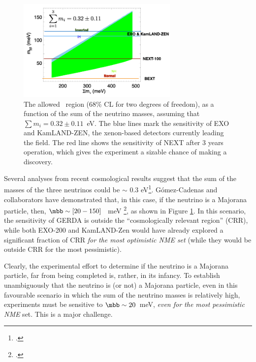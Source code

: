 \begin{figure}
\centering
\includegraphics[width=0.70\textwidth]{img/SensiCRR.png}
\caption{\small The allowed \mbb\ region (68\% CL for two degrees of freedom), as a function of the sum of the neutrino masses, assuming that 
$\sum m_i = 0.32\pm 0.11$~eV. The blue lines mark the sensitivity of EXO and KamLAND-ZEN, the xenon-based detectors currently leading the field. The red line shows the sensitivity of NEXT after 3 years operation, which gives the experiment a sizable chance of making a discovery.} 
\label{fig.mbb}
\end{figure}

 Several analyses from recent cosmological results suggest that the sum of the masses of the three neutrinos could be $\sim$ 0.3 eV\footcite{PhysRevLett.112.051303}. G\'omez-Cadenas and collaborators have demonstrated that, in this case, if the neutrino is a Majorana particle, then, $\mbb \sim [20-150]$~ meV \footcite{GomezCadenas:2013ue}, as shown in Figure \ref{fig.mbb}. In this scenario, the sensitivity of GERDA is outside the ``cosmologically relevant region'' (CRR), while both EXO-200 and KamLAND-Zen would have already explored a significant fraction of CRR {\em for the most optimistic NME set} (while they would be outside CRR for the most pessimistic). 
 
Clearly, the experimental effort to determine if the neutrino is a Majorana particle, far from being completed is, rather, in its infancy. To establish unambiguously that the neutrino is (or not) a Majorana particle, even in this favourable scenario in which the sum of the neutrino masses is relatively high, experiments must be sensitive to $\mbb \sim 20$~meV, {\em even for the most pessimistic NME} set. This is a major challenge.
% 
 
